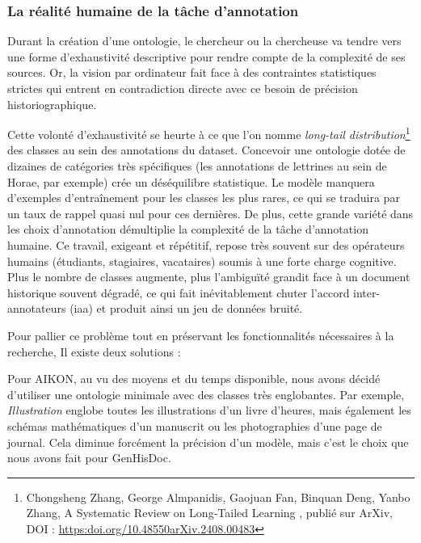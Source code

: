 \subsubsection{La réalité humaine de la tâche d'annotation}

Durant la création d'une ontologie, le chercheur ou la chercheuse va tendre vers une forme d'exhaustivité descriptive pour rendre compte de la complexité de ses sources. Or, la vision par ordinateur fait face à des contraintes statistiques strictes qui entrent en contradiction directe avec ce besoin de précision historiographique. 

Cette volonté d'exhaustivité se heurte à ce que l'on nomme \textit{long-tail distribution}\footnote{Chongsheng Zhang, George Almpanidis, Gaojuan Fan, Binquan Deng, Yanbo Zhang, \og A Systematic Review on Long-Tailed Learning \fg, publié sur ArXiv, DOI : \href{https://doi.org/10.48550/arXiv.2408.00483}{https:\/\/doi.org/10.48550\/arXiv.2408.00483}} des classes au sein des annotations du dataset. Concevoir une ontologie dotée de dizaines de catégories très spécifiques (les annotations de lettrines au sein de Horae, par exemple) crée un déséquilibre statistique. Le modèle manquera d'exemples d'entraînement pour les classes les plus rares, ce qui se traduira par un taux de rappel quasi nul pour ces dernières. De plus, cette grande variété dans les choix d'annotation démultiplie la complexité de la tâche d'annotation humaine. Ce travail, exigeant et répétitif, repose très souvent sur des opérateurs humains (étudiants, stagiaires, vacataires) soumis à une forte charge cognitive. Plus le nombre de classes augmente, plus l'ambiguïté grandit face à un document historique souvent dégradé, ce qui fait inévitablement chuter l'accord inter-annotateurs (\gls{iaa}) et produit ainsi un jeu de données bruité. 

Pour pallier ce problème tout en préservant les fonctionnalités nécessaires à la recherche, Il existe deux solutions : 

Pour AIKON, au vu des moyens et du temps disponible, nous avons décidé d'utiliser une ontologie minimale avec des classes très englobantes. Par exemple, \textit{Illustration} englobe toutes les illustrations d'un livre d'heures, mais également les schémas mathématiques d'un manuscrit ou les photographies d'une page de journal. Cela diminue forcément la précision d'un modèle, mais c'est le choix que nous avons fait pour GenHisDoc. 


